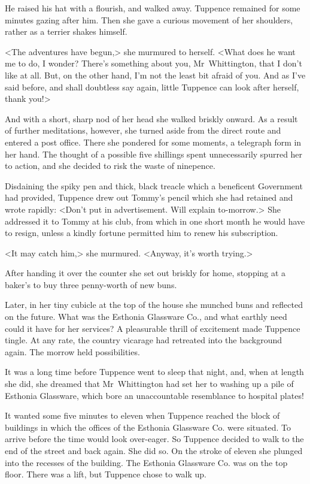 He raised his hat with a flourish, and walked away. Tuppence remained for some minutes gazing after him. Then she gave a curious movement of her shoulders, rather as a terrier shakes himself.

<The adventures have begun,> she murmured to herself. <What does he want me to do, I wonder? There's something about you, Mr~Whittington, that I don't like at all. But, on the other hand, I'm not the least bit afraid of you. And as I've said before, and shall doubtless say again, little Tuppence can look after herself, thank you!>

And with a short, sharp nod of her head she walked briskly onward. As a result of further meditations, however, she turned aside from the direct route and entered a post office. There she pondered for some moments, a telegraph form in her hand. The thought of a possible five shillings spent unnecessarily spurred her to action, and she decided to risk the waste of ninepence.

Disdaining the spiky pen and thick, black treacle which a beneficent Government had provided, Tuppence drew out Tommy's pencil which she had retained and wrote rapidly: <Don't put in advertisement. Will explain to-morrow.> She addressed it to Tommy at his club, from which in one short month he would have to resign, unless a kindly fortune permitted him to renew his subscription.

<It may catch him,> she murmured. <Anyway, it's worth trying.>

After handing it over the counter she set out briskly for home, stopping at a baker's to buy three penny-worth of new buns.

Later, in her tiny cubicle at the top of the house she munched buns and reflected on the future. What was the Esthonia Glassware Co., and what earthly need could it have for her services? A pleasurable thrill of excitement made Tuppence tingle. At any rate, the country vicarage had retreated into the background again. The morrow held possibilities.

It was a long time before Tuppence went to sleep that night, and, when at length she did, she dreamed that Mr~Whittington had set her to washing up a pile of Esthonia Glassware, which bore an unaccountable resemblance to hospital plates!

It wanted some five minutes to eleven when Tuppence reached the block of buildings in which the offices of the Esthonia Glassware Co. were situated. To arrive before the time would look over-eager. So Tuppence decided to walk to the end of the street and back again. She did so. On the stroke of eleven she plunged into the recesses of the building. The Esthonia Glassware Co. was on the top floor. There was a lift, but Tuppence chose to walk up.

